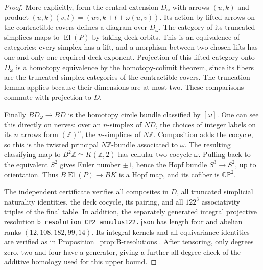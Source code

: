 \begin{proof}
More explicitly, form the central extension $D_\omega$ with arrows
$(u,k)$ and product $(u,k)(v,l)=(uv,k+l+\omega(u,v))$.
Its action by lifted arrows on the contractible covers defines a
diagram over $D_\omega$.  The category of its truncated simplices
maps to $\operatorname{El}(P)$ by taking deck orbits.  This is an
equivalence of categories: every simplex has a lift, and a morphism
between two chosen lifts has one and only one required deck exponent.
Projection of this lifted category onto $D_\omega$ is a homotopy
equivalence by the homotopy-colimit theorem, since its fibers are the
truncated simplex categories of the contractible covers.  The
truncation lemma applies because their dimensions are at most two.
These comparisons commute with projection to $D$.

Finally $BD_\omega\to BD$ is the homotopy circle bundle classified
by $[\omega]$.  One can see this directly on nerves: over an
$n$-simplex of $ND$, the choices of integer labels on its $n$ arrows
form $(\mathbb Z)^n$, the $n$-simplices of $N\mathbb Z$.
Composition adds the cocycle, so this is the twisted principal
$N\mathbb Z$-bundle associated to $\omega$.  The resulting
classifying map to $B^2\mathbb Z\simeq K(\mathbb Z,2)$ has
cellular two-cocycle $\omega$.  Pulling back to the equivalent
$S^2$ gives Euler number $\pm1$, hence the Hopf bundle
$S^3\to S^2$, up to orientation.  Thus
$B\operatorname{El}(P)\to BK$ is a Hopf map, and its cofiber is
$\mathbb{CP}^2$.

The independent certificate verifies all composites in $D$, all
truncated simplicial naturality identities, the deck cocycle, its
pairing, and all $122^3$ associativity triples of the final table.
In addition, the separately generated integral projective resolution
\texttt{b\_resolution\_CP2\_annulus122.json} has length four and
abelian ranks $(12,108,182,99,14)$.  Its integral kernels and all
equivariance identities are verified as in
Proposition~\ref{prop:B-resolutions}.  After tensoring, only degrees
zero, two and four have a generator, giving a further all-degree
check of the additive homology used for this upper bound.
\end{proof}

